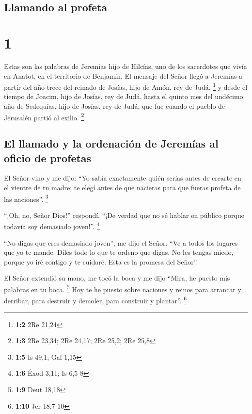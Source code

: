 \hypertarget{llamando-al-profeta}{%
\subsection{Llamando al profeta}\label{llamando-al-profeta}}

\hypertarget{section}{%
\section{1}\label{section}}

 Estas son las palabras de Jeremías hijo de Hilcías, uno
de los sacerdotes que vivía en Anatot, en el territorio de Benjamín.
 El mensaje del Señor llegó a Jeremías a partir del año
trece del reinado de Josías, hijo de Amón, rey de Judá, \footnote{\textbf{1:2}
  2Re 21,24}  y desde el tiempo de Joacim, hijo de Josías,
rey de Judá, hasta el quinto mes del undécimo año de Sedequías, hijo de
Josías, rey de Judá, que fue cuando el pueblo de Jerusalén partió al
exilio. \footnote{\textbf{1:3} 2Re 23,34; 2Re 24,17; 2Re 25,2; 2Re 25,8}

\hypertarget{el-llamado-y-la-ordenaciuxf3n-de-jeremuxedas-al-oficio-de-profetas}{%
\subsection{El llamado y la ordenación de Jeremías al oficio de
profetas}\label{el-llamado-y-la-ordenaciuxf3n-de-jeremuxedas-al-oficio-de-profetas}}

 El Señor vino y me dijo:  ``Yo sabía
exactamente quién serías antes de crearte en el vientre de tu madre; te
elegí antes de que nacieras para que fueras profeta de las naciones''.
\footnote{\textbf{1:5} Is 49,1; Gal 1,15}

 ``¡Oh, no, Señor Dios!'' respondí. ``¡De verdad que no sé
hablar en público porque todavía soy demasiado joven!''. \footnote{\textbf{1:6}
  Éxod 3,11; Is 6,5-8}

 ``No digas que eres demasiado joven'', me dijo el Señor.
``Ve a todos los lugares que yo te mande. Diles todo lo que te ordeno
que digas.  No les tengas miedo, porque yo iré contigo y
te cuidaré. Esta es la promesa del Señor''.

 El Señor extendió su mano, me tocó la boca y me dijo
``Mira, he puesto mis palabras en tu boca. \footnote{\textbf{1:9} Deut
  18,18}  Hoy te he puesto sobre naciones y reinos para
arrancar y derribar, para destruir y demoler, para construir y
plantar''. \footnote{\textbf{1:10} Jer 18,7-10}

